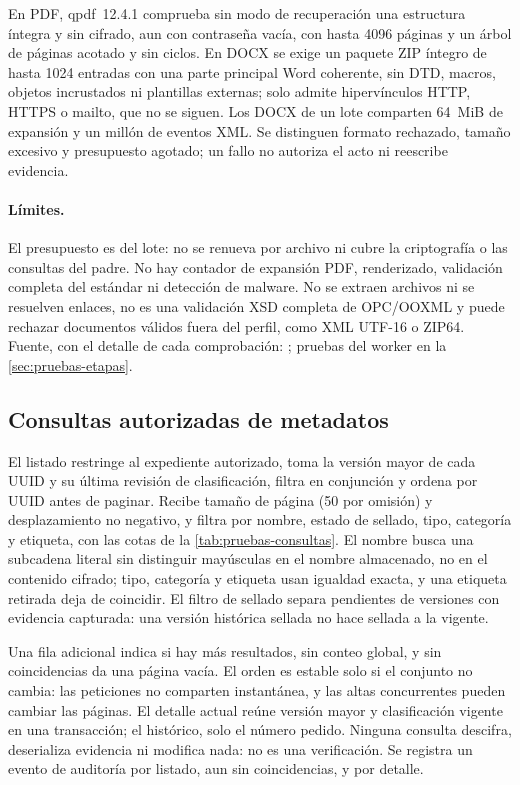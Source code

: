 En PDF, qpdf~12.4.1 comprueba sin modo de recuperación una estructura íntegra y sin cifrado, aun con contraseña vacía, con hasta 4096 páginas y un árbol de páginas acotado y sin ciclos. En DOCX se exige un paquete ZIP íntegro de hasta 1024 entradas con una parte principal Word coherente, sin DTD, macros, objetos incrustados ni plantillas externas; solo admite hipervínculos HTTP, HTTPS o mailto, que no se siguen. Los DOCX de un lote comparten 64~MiB de expansión y un millón de eventos XML. Se distinguen formato rechazado, tamaño excesivo y presupuesto agotado; un fallo no autoriza el acto ni reescribe evidencia.

\paragraph{Límites.} El presupuesto es del lote: no se renueva por archivo ni cubre la criptografía o las consultas del padre. No hay contador de expansión PDF, renderizado, validación completa del estándar ni detección de malware. No se extraen archivos ni se resuelven enlaces, no es una validación XSD completa de OPC/OOXML y puede rechazar documentos válidos fuera del perfil, como XML \mbox{UTF-16} o ZIP64. Fuente, con el detalle de cada comprobación: ; pruebas del worker en la \cref{sec:pruebas-etapas}.

\subsection{Consultas autorizadas de metadatos}\label{sec:impl-http-consultas}

El listado restringe al expediente autorizado, toma la versión mayor de cada UUID y su última revisión de clasificación, filtra en conjunción y ordena por UUID antes de paginar. Recibe tamaño de página (50 por omisión) y desplazamiento no negativo, y filtra por nombre, estado de sellado, tipo, categoría y etiqueta, con las cotas de la \cref{tab:pruebas-consultas}. El nombre busca una subcadena literal sin distinguir mayúsculas en el nombre almacenado, no en el contenido cifrado; tipo, categoría y etiqueta usan igualdad exacta, y una etiqueta retirada deja de coincidir. El filtro de sellado separa pendientes de versiones con evidencia capturada: una versión histórica sellada no hace sellada a la vigente.

Una fila adicional indica si hay más resultados, sin conteo global, y sin coincidencias da una página vacía. El orden es estable solo si el conjunto no cambia: las peticiones no comparten instantánea, y las altas concurrentes pueden cambiar las páginas. El detalle actual reúne versión mayor y clasificación vigente en una transacción; el histórico, solo el número pedido. Ninguna consulta descifra, deserializa evidencia ni modifica nada: no es una verificación. Se registra un evento de auditoría por listado, aun sin coincidencias, y por detalle.

